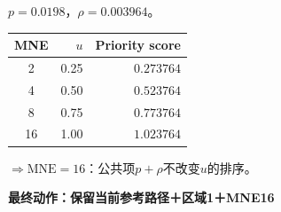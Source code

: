 \begin{minipage}[c]{0.55\textwidth}\small
$p=0.0198$，$\rho=0.003964$。\par
\begin{tabular}{@{}crr@{}}\toprule MNE & $u$ & Priority score\\\midrule
2 & 0.25 & $0.273764$\\
4 & 0.50 & $0.523764$\\
8 & 0.75 & $0.773764$\\
16 & 1.00 & $\mathbf{1.023764}$\\
\bottomrule\end{tabular}\par\smallskip
$\Rightarrow\mathrm{MNE}=16$：公共项$p+\rho$不改变$u$的排序。
\end{minipage}\par\medskip
\centering\textbf{最终动作：保留当前参考路径＋区域1＋MNE16}\par
